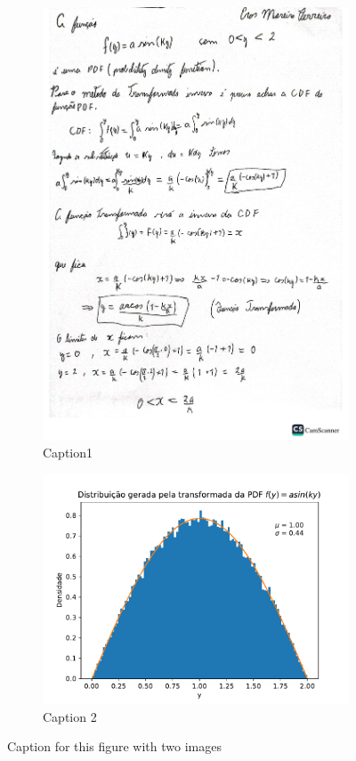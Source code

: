 \documentclass[12pt]{article}
\begin{document}
\begin{figure}[h]

\begin{subfigure}{0.5\textwidth}
\includegraphics[width=0.9\linewidth]{transformada_inversa.pdf} 
\caption{Caption1}
\label{fig:subim1}
\end{subfigure}

\begin{subfigure}{0.5\textwidth}
\includegraphics[width=0.9\linewidth]{transformada_seno.pdf}
\caption{Caption 2}
\label{fig:subim2}
\end{subfigure}

\caption{Caption for this figure with two images}
\label{fig:image2}
\end{figure}
\end{document}
